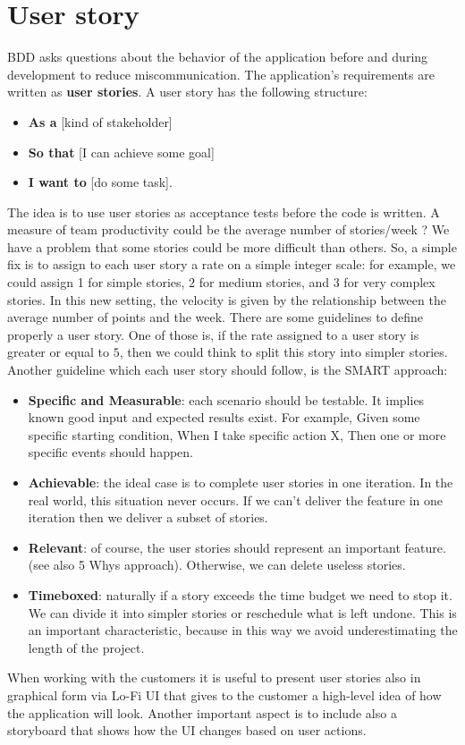 \section{User story}
BDD asks questions about the behavior of the application before and during development to reduce miscommunication.
The application's requirements are written as \textbf{user stories}.
A user story has the following structure:
\begin{itemize}
    \item \textbf{As a} [kind of stakeholder]
    \item \textbf{So that} [I can achieve some goal]
    \item \textbf{I want to} [do some task].
\end{itemize}
The idea is to use user stories as acceptance tests before the code is written.
A measure of team productivity could be the average number of stories/week ? We have a problem that some stories could be more difficult than others.
So, a simple fix is to assign to each user story a rate on a simple integer scale: for example, we could assign 1 for simple stories, $2$ for medium stories, and $3$ for very complex stories.
In this new setting, the velocity is given by the relationship between the average number of points and the week.
There are some guidelines to define properly a user story.
One of those is, if the rate assigned to a user story is greater or equal to $5$, then we could think to split this story into simpler stories.
Another guideline which each user story should follow, is the SMART approach:
\begin{itemize}
    \item \textbf{Specific and Measurable}: each scenario should be testable. It implies known good input and expected results exist. For example, Given some specific starting condition, When I take specific action X, Then one or more specific events should happen.
    \item \textbf{Achievable}: the ideal case is to complete user stories in one iteration. In the real world, this situation never occurs. If we can't deliver the feature in one iteration then we deliver a subset of stories.
    \item \textbf{Relevant}: of course, the user stories should represent an important feature. (see also 5 Whys approach). Otherwise, we can delete useless stories.
    \item \textbf{Timeboxed}: naturally if a story exceeds the time budget we need to stop it. We can divide it into simpler stories or reschedule what is left undone. This is an important characteristic, because in this way we avoid underestimating the length of the project.
\end{itemize}
When working with the customers it is useful to present user stories also in graphical form via Lo-Fi UI that gives to the customer a high-level idea of how the application will look.
Another important aspect is to include also a storyboard that shows how the UI changes based on user actions.
